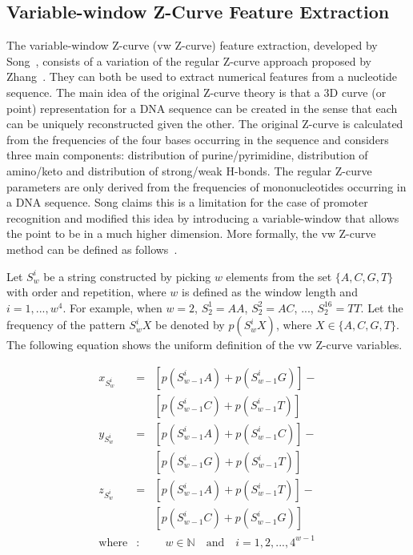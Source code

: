 \documentclass[conference,letterpaper]{IEEEtran}
\begin{document}
\subsection{Variable-window Z-Curve Feature Extraction}

The variable-window Z-curve (vw Z-curve) feature extraction, developed by Song~\cite{song2011a}, consists of a variation of the regular Z-curve approach proposed by Zhang~\cite{zhang1997}. They can both be used to extract numerical features from a nucleotide sequence. The main idea of the original Z-curve theory is that a 3D curve (or point) representation for a DNA sequence can be created in the sense that each can be uniquely reconstructed given the other. The original Z-curve is calculated from the frequencies of the four bases occurring in the sequence and considers three main components: distribution of purine/pyrimidine, distribution of amino/keto and distribution of strong/weak H-bonds. The regular Z-curve parameters are only derived from the frequencies of mononucleotides occurring in a DNA sequence. Song claims this is a limitation for the case of promoter recognition and modified this idea by introducing a variable-window that allows the point to be in a much higher dimension. More formally, the vw Z-curve method can be defined as follows~\cite{song2011a}.

Let $ S_{w}^{i} $ be a string constructed by picking $ w $ elements from the set $ \{A,C,G,T\} $ with order and repetition, where $ w $ is defined as the window length and $ i = 1, ..., w^{4} $. For example, when $ w = 2 $, $ S_{2}^{1} = AA $, $ S_{2}^{2} = AC $, ..., $ S_{2}^{16} = TT $. Let the frequency of the pattern $ S_{w}^{i}X $ be denoted by $ p\left(S_{w}^{i}X\right) $, where $ X \in \{A,C,G,T\} $. The following equation shows the uniform definition of the vw Z-curve variables.

\begin{equation}
    \begin{array}{lcl}
        x_{S_{w}^{i}} & = & [p\left(S_{w-1}^{i}A\right) + p\left(S_{w-1}^{i}G\right)] - \\
                      &   & [p\left(S_{w-1}^{i}C\right) + p\left(S_{w-1}^{i}T\right)] \\[0.3cm]
        y_{S_{w}^{i}} & = & [p\left(S_{w-1}^{i}A\right) + p\left(S_{w-1}^{i}C\right)] - \\
                      &   & [p\left(S_{w-1}^{i}G\right) + p\left(S_{w-1}^{i}T\right)] \\[0.3cm]
        z_{S_{w}^{i}} & = & [p\left(S_{w-1}^{i}A\right) + p\left(S_{w-1}^{i}T\right)] - \\
                      &   & [p\left(S_{w-1}^{i}C\right) + p\left(S_{w-1}^{i}G\right)] \\[0.3cm]
        \text{where}  & : & \quad w \in \mathbb{N} \quad \text{and} \quad i = 1, 2, ..., 4^{w-1} \\
    \end{array} 
    \label{eq:xdef}
\end{equation}
\end{document}
